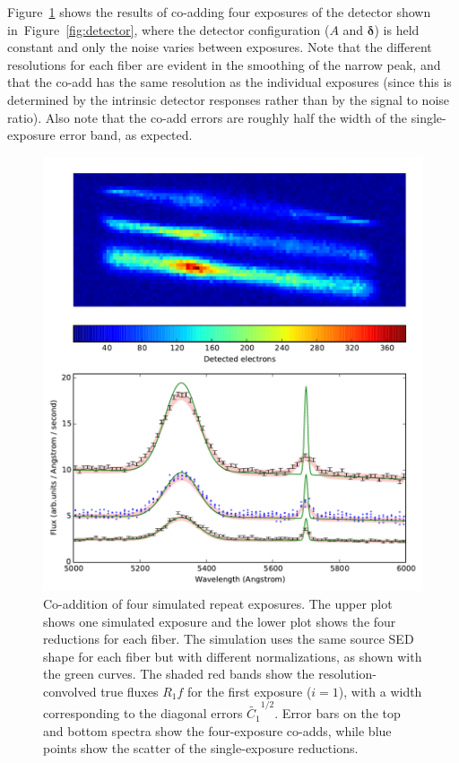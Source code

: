 \documentclass[12pt]{article}
\providecommand{\fig}[1]{Figure~\ref{fig:#1}}
\providecommand{\vecsymbol}[1]{\ensuremath{\boldsymbol{#1}}}
\providecommand{\deltav}{\vecsymbol{\delta}}
\begin{document}
\fig{repeats} shows the results of co-adding four exposures of the detector shown in~\fig{detector}, where the detector configuration ($A$ and $\deltav$) is held constant and only the noise varies between exposures. Note that the different resolutions for each fiber are evident in the smoothing of the narrow peak, and that the co-add has the same resolution as the individual exposures (since this is determined by the intrinsic detector responses rather than by the signal to noise ratio). Also note that the co-add errors are roughly half the width of the single-exposure error band, as expected.

\begin{figure}[htb]
\begin{center}
\includegraphics[width=5in]{fig/repeats}
\caption{Co-addition of four simulated repeat exposures. The upper plot shows one simulated exposure and the lower plot shows the four reductions for each fiber. The simulation uses the same source SED shape for each fiber but with different normalizations, as shown with the green curves.  The shaded red bands show the resolution-convolved true fluxes $R_1 f$ for the first exposure ($i=1$), with a width corresponding to the diagonal errors $\tilde{C_1}^{1/2}$. Error bars on the top and bottom spectra show the four-exposure co-adds, while blue points show the scatter of the single-exposure reductions.}
\label{fig:repeats}
\end{center}
\end{figure}
\end{document}
